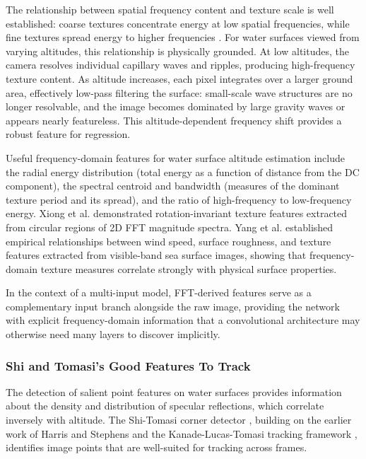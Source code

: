     The relationship between spatial frequency content and texture scale is well established: coarse textures concentrate energy at low spatial frequencies, while fine textures spread energy to higher frequencies \cite{Haralick1973}. For water surfaces viewed from varying altitudes, this relationship is physically grounded. At low altitudes, the camera resolves individual capillary waves and ripples, producing high-frequency texture content. As altitude increases, each pixel integrates over a larger ground area, effectively low-pass filtering the surface: small-scale wave structures are no longer resolvable, and the image becomes dominated by large gravity waves or appears nearly featureless. This altitude-dependent frequency shift provides a robust feature for regression.

    Useful frequency-domain features for water surface altitude estimation include the radial energy distribution (total energy as a function of distance from the DC component), the spectral centroid and bandwidth (measures of the dominant texture period and its spread), and the ratio of high-frequency to low-frequency energy. Xiong et al. \cite{Xiong2006} demonstrated rotation-invariant texture features extracted from circular regions of 2D FFT magnitude spectra. Yang et al. \cite{SeaSurfaceTexture2020} established empirical relationships between wind speed, surface roughness, and texture features extracted from visible-band sea surface images, showing that frequency-domain texture measures correlate strongly with physical surface properties.

    In the context of a multi-input model, FFT-derived features serve as a complementary input branch alongside the raw image, providing the network with explicit frequency-domain information that a convolutional architecture may otherwise need many layers to discover implicitly.

    \subsubsection{Shi and Tomasi's Good Features To Track}

    The detection of salient point features on water surfaces provides information about the density and distribution of specular reflections, which correlate inversely with altitude. The Shi-Tomasi corner detector \cite{ShiTomasi1994}, building on the earlier work of Harris and Stephens \cite{Harris1988} and the Kanade-Lucas-Tomasi tracking framework \cite{TomasiKanade1991}, identifies image points that are well-suited for tracking across frames.

